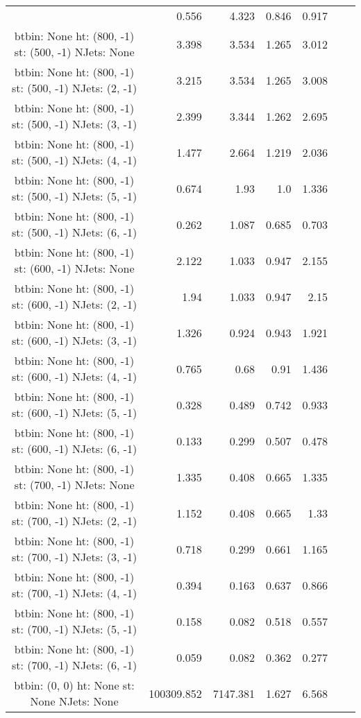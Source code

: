 \documentclass[12pt]{paper}
\begin{document}
\begin{landscape}
\begin{longtable}{c|r|r|r|r|r|r}
 & 0.556 & 4.323 & 0.846 & 0.917\\
btbin:  None ht:  (800, -1) st:  (500, -1) NJets:  None
 & 3.398 & 3.534 & 1.265 & 3.012\\
btbin:  None ht:  (800, -1) st:  (500, -1) NJets:  (2, -1)
 & 3.215 & 3.534 & 1.265 & 3.008\\
btbin:  None ht:  (800, -1) st:  (500, -1) NJets:  (3, -1)
 & 2.399 & 3.344 & 1.262 & 2.695\\
btbin:  None ht:  (800, -1) st:  (500, -1) NJets:  (4, -1)
 & 1.477 & 2.664 & 1.219 & 2.036\\
btbin:  None ht:  (800, -1) st:  (500, -1) NJets:  (5, -1)
 & 0.674 & 1.93 & 1.0 & 1.336\\
btbin:  None ht:  (800, -1) st:  (500, -1) NJets:  (6, -1)
 & 0.262 & 1.087 & 0.685 & 0.703\\
btbin:  None ht:  (800, -1) st:  (600, -1) NJets:  None
 & 2.122 & 1.033 & 0.947 & 2.155\\
btbin:  None ht:  (800, -1) st:  (600, -1) NJets:  (2, -1)
 & 1.94 & 1.033 & 0.947 & 2.15\\
btbin:  None ht:  (800, -1) st:  (600, -1) NJets:  (3, -1)
 & 1.326 & 0.924 & 0.943 & 1.921\\
btbin:  None ht:  (800, -1) st:  (600, -1) NJets:  (4, -1)
 & 0.765 & 0.68 & 0.91 & 1.436\\
btbin:  None ht:  (800, -1) st:  (600, -1) NJets:  (5, -1)
 & 0.328 & 0.489 & 0.742 & 0.933\\
btbin:  None ht:  (800, -1) st:  (600, -1) NJets:  (6, -1)
 & 0.133 & 0.299 & 0.507 & 0.478\\
btbin:  None ht:  (800, -1) st:  (700, -1) NJets:  None
 & 1.335 & 0.408 & 0.665 & 1.335\\
btbin:  None ht:  (800, -1) st:  (700, -1) NJets:  (2, -1)
 & 1.152 & 0.408 & 0.665 & 1.33\\
btbin:  None ht:  (800, -1) st:  (700, -1) NJets:  (3, -1)
 & 0.718 & 0.299 & 0.661 & 1.165\\
btbin:  None ht:  (800, -1) st:  (700, -1) NJets:  (4, -1)
 & 0.394 & 0.163 & 0.637 & 0.866\\
btbin:  None ht:  (800, -1) st:  (700, -1) NJets:  (5, -1)
 & 0.158 & 0.082 & 0.518 & 0.557\\
btbin:  None ht:  (800, -1) st:  (700, -1) NJets:  (6, -1)
 & 0.059 & 0.082 & 0.362 & 0.277\\
btbin:  (0, 0) ht:  None st:  None NJets:  None
 & 100309.852 & 7147.381 & 1.627 & 6.568\\

\end{longtable}
\end{landscape}
\end{document}
